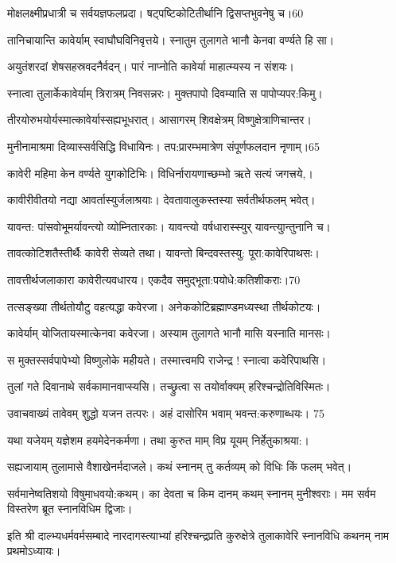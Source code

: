  मोक्षलक्ष्मीप्रधात्री च सर्वयज्ञफलप्रदा।
 षट्पष्टिकोटितीर्थानि द्विसप्तभुवनेषु च।60

 तानिचायान्ति कावेर्याम् स्वाघौघविनिवृत्तये।
 स्नातुम तुलागते भानौ केनवा वर्ण्यते हि सा।
 
 अयुतंशरदां शेषसहस्रवदनैर्वदन्।
 पारं नाप्नोति कावेर्या माहात्म्यस्य न संशयः।
 
 स्नात्वा तुलार्केकावेर्याम् त्रिरात्रम् निवसन्नरः।
 मुक्तपापो दिवम्याति स पापोप्यपर:किमु।
 
 तीरयोरुभयोर्यस्मात्कावेर्यास्सह्यभूधरात्।
 आसागरम् शिवक्षेत्रम् विष्णुक्षेत्राणिचान्तर।
 
 मुनीनामाश्रमा दिव्यास्सर्वसिद्धि विधायिनः।
 तप:प्रारम्भमात्रेण संपूर्णफलदान नृणाम्।65

 कावेरी महिमा केन वर्ण्यते युगकोटिभिः।
 विधिर्नारायणाच्छम्भो ऋते सत्यं जगत्त्रये,।
 
 कावीरीवीतयो नद्या आवर्तास्युर्जलाश्रयाः।
 देवतावालुकस्तस्या सर्वतीर्थफलम् भवेत्।
 
 यावन्त: पांसवोभूमर्यावन्त्यो व्योम्नितारकाः।
 यावन्त्यो वर्षधारास्स्युर् यावन्त्युान्तुनानि च।
 
 तावत्कोटिशतैस्तीर्थैः कावेरी सेव्यते तथा।
 यावन्तो बिन्दवस्तस्यु: पूरा:कावेरिपाथसः।
 
 तावत्तीर्थजलाकारा कावेरीत्यवधारय।
 एकदैव समुद्भूता:पयोधे:कतिशीकराः।70

 तत्सङ्ख्या तीर्थतोयौटु वहत्यद्धा कवेरजा।
 अनेककोटिब्रह्माण्डमध्यस्था तीर्थकोटयः।
 
 कावेर्याम् योजितायस्मात्केनवा कवेरजा।
 अस्याम तुलागते भानौ मासि यस्नाति मानसः।
 
 स मुक्तस्सर्वपापेभ्यो विष्णुलोके महीयते।
 तस्मात्त्वमपि राजेन्द्र ! स्नात्वा कवेरिपाथसि।
 
 तुलां गते दिवानाथे सर्वकामानवाप्स्यसि।
 तच्छ्रुत्वा स तयोर्वाक्यम् हरिश्चन्द्रोतिविस्मितः।
 
 उवाचवाख्यं तावेवम् शुद्धो यजन तत्परः।
 अहं दासोरिम भवाम् भवन्त:करुणाब्धयः। 75

 यथा यजेयम् यज्ञेशम हयमेदेनकर्मणा।
 तथा कुरुत माम् विप्र यूयम् निर्हेतुकाश्रया:।
 
सह्यजायाम् तुलामासे वैशाखेनर्मदाजले।
कथं स्नानम् तु कर्तव्यम् को विधिः किं फलम् भवेत्।

सर्वमानेष्वतिशयो विषुमाधवयो:कथम्।
का देवता च किम दानम् कथम् स्नानम् मुनीश्वराः।
मम सर्वम विस्तरेण ब्रूत स्नानविधिम द्विजाः।

 इति श्री दाल्भ्यधर्मवर्मसम्बादे नारदागस्त्याभ्यां हरिश्चन्द्रप्रति कुरुक्षेत्रे तुलाकावेरि स्नानविधि कथनम् नाम प्रथमोऽध्यायः।
 


